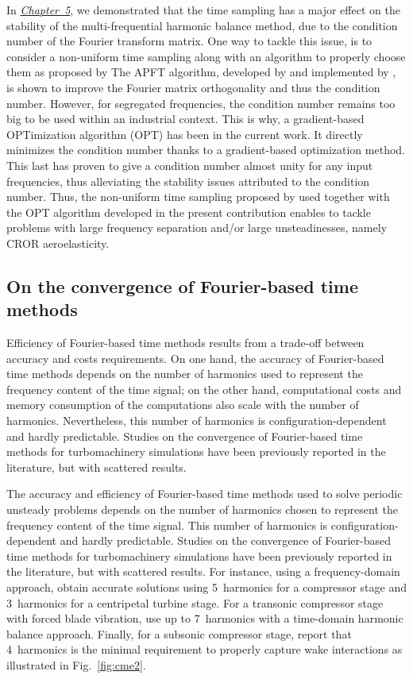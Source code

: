 In \hyperref[cha:limitations_condition_number]{\emph{Chapter~5}},
we demonstrated that the time sampling has a major effect on the
stability of the multi-frequential harmonic balance 
method, due to the condition number of the Fourier
transform matrix. One way to tackle this issue, 
is to consider a non-uniform time sampling
along with an algorithm to properly choose them
as proposed by \citet{ThesisGuedeney}
The APFT algorithm, developed
by \citet{Kundert1988} and implemented by 
\citet{ThesisGuedeney}, is shown to improve the
Fourier matrix orthogonality and thus the condition number.
However, for segregated frequencies, the condition number
remains too big to be used within an industrial context.
This is why, a gradient-based OPTimization algorithm (OPT) 
has been in the current work.
It directly minimizes the condition number thanks to a
gradient-based optimization method. This last has proven to
give a condition number almost unity for any input frequencies,
thus alleviating the stability issues attributed to 
the condition number.
Thus, the non-uniform time sampling proposed by \citet{ThesisGuedeney}
used together with the OPT algorithm 
developed in the present contribution
enables to tackle problems with large frequency 
separation and/or large unsteadinesses, namely CROR aeroelasticity.

\subsection*{On the convergence of Fourier-based time methods}

Efficiency of Fourier-based time methods results 
from a trade-off between accuracy and 
costs requirements.
On one hand, the accuracy of Fourier-based
time methods depends on the number of harmonics
used to represent the frequency content of the time 
signal; on the other hand, computational costs and 
memory consumption of the computations also scale
with the number of harmonics. 
Nevertheless, this number of harmonics is configuration-dependent 
and hardly predictable. Studies on the convergence of 
Fourier-based time methods for turbomachinery simulations 
have been previously reported in the literature, 
but with scattered results. 

The accuracy and efficiency of Fourier-based time methods 
used to solve periodic unsteady problems depends on the number of harmonics
chosen to represent the frequency content of the time signal.
This number of harmonics is configuration-dependent 
and hardly predictable. Studies on the convergence of 
Fourier-based time methods for turbomachinery simulations 
have been previously reported in the literature, 
but with scattered results. 
For instance, using a frequency-domain approach, 
\citet{Vilmin2006} obtain accurate solutions 
using 5~harmonics for a compressor stage and 3~harmonics for a 
centripetal turbine stage. For a transonic compressor stage with 
forced blade vibration, \citet{ekici2010} use 
up to 7~harmonics with a time-domain harmonic balance approach. Finally, for a 
subsonic compressor stage, \citet{Sicot2012} report 
that 4~harmonics is the minimal requirement to properly capture wake interactions
as illustrated in Fig.~\ref{fig:cme2}. 

